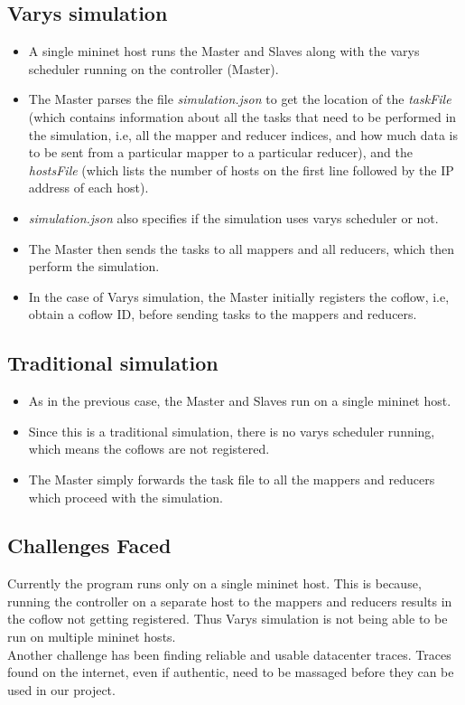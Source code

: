 \documentclass{article}
\begin{document}
\subsection{Varys simulation}
\begin{itemize}
	\item A single mininet host runs the Master and Slaves along with the varys scheduler running on the controller (Master).
	\item The Master parses the file \textit{simulation.json} to get the location of the \textit{taskFile} (which contains information about all the tasks that need to be performed in the simulation, i.e, all the mapper and reducer indices, and how much data is to be sent from a particular mapper to a particular reducer), and the \textit{hostsFile} (which lists the number of hosts on the first line followed by the IP address of each host).
	\item \textit{simulation.json} also specifies if the simulation uses varys scheduler or not.
	\item The Master then sends the tasks to all mappers and all reducers, which then perform the simulation.
	\item In the case of Varys simulation, the Master initially registers the coflow, i.e, obtain a coflow ID, before sending tasks to the mappers and reducers.
\end{itemize}
\subsection{Traditional simulation}
\begin{itemize}
	\item As in the previous case, the Master and Slaves run on a single mininet host.
	\item Since this is a traditional simulation, there is no varys scheduler running, which means the coflows are not registered.
	\item The Master simply forwards the task file to all the mappers and reducers which proceed with the simulation.
\end{itemize}
\subsection{Challenges Faced}
Currently the program runs only on a single mininet host. This is because, running the controller on a separate host to the mappers and reducers results in the coflow not getting registered. Thus Varys simulation is not being able to be run on multiple mininet hosts.\\Another challenge has been finding reliable and usable datacenter traces. Traces found on the internet, even if authentic, need to be massaged before they can be used in our project.
\end{document}
